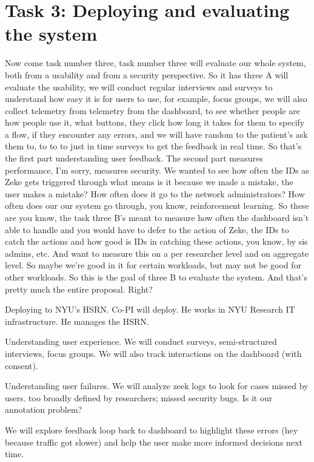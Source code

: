 \section{Task 3: Deploying and evaluating the system}




Now come task number three, task number three will evaluate our whole system, both from a usability and from a security perspective. So it has three A will evaluate the usability, we will conduct regular interviews and surveys to understand how easy it is for users to use, for example, focus groups, we will also collect telemetry from telemetry from the dashboard, to see whether people are how people use it, what buttons, they click how long it takes for them to specify a flow, if they encounter any errors, and we will have random to the patient's ask them to, to to to just in time surveys to get the feedback in real time. So that's the first part understanding user feedback. The second part measures performance, I'm sorry, measures security. We wanted to see how often the IDs as Zeke gets triggered through what means is it because we made a mistake, the user makes a mistake? How often does it go to the network administrators? How often does our our system go through, you know, reinforcement learning. So these are you know, the task three B's meant to measure how often the dashboard isn't able to handle and you would have to defer to the action of Zeke, the IDs to catch the actions and how good is IDs in catching these actions, you know, by sis admins, etc. And want to measure this on a per researcher level and on aggregate level. So maybe we're good in it for certain workloads, but may not be good for other workloads. So this is the goal of three B to evaluate the system. And that's pretty much the entire proposal. Right?




Deploying to NYU's HSRN. Co-PI will deploy. He works in NYU Research IT infrastructure. He manages the HSRN.

Understanding user experience. We will conduct surveys, semi-structured interviews, focus groups. We will also track interactions on the dashboard (with consent).

Understanding user failures. We will analyze zeek logs to look for cases missed by users. too broadly defined by researchers; missed security bugs.  Is it our annotation problem?

We will explore feedback loop back to dashboard to highlight these errors (hey because traffic got slower) and help the user make more informed decisions next time.


